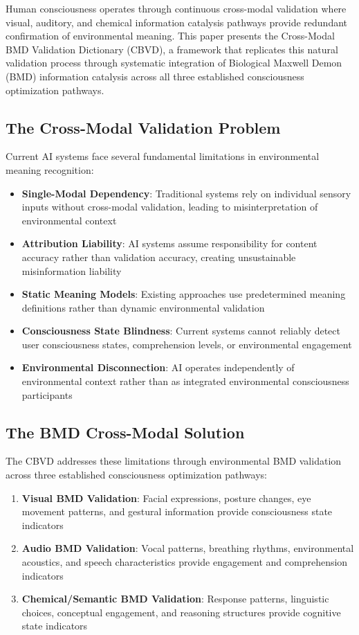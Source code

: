 \documentclass[12pt,a4paper]{article}
\begin{document}
Human consciousness operates through continuous cross-modal validation where visual, auditory, and chemical information catalysis pathways provide redundant confirmation of environmental meaning. This paper presents the Cross-Modal BMD Validation Dictionary (CBVD), a framework that replicates this natural validation process through systematic integration of Biological Maxwell Demon (BMD) information catalysis across all three established consciousness optimization pathways.

\subsection{The Cross-Modal Validation Problem}

Current AI systems face several fundamental limitations in environmental meaning recognition:

\begin{itemize}
\item \textbf{Single-Modal Dependency}: Traditional systems rely on individual sensory inputs without cross-modal validation, leading to misinterpretation of environmental context
\item \textbf{Attribution Liability}: AI systems assume responsibility for content accuracy rather than validation accuracy, creating unsustainable misinformation liability
\item \textbf{Static Meaning Models}: Existing approaches use predetermined meaning definitions rather than dynamic environmental validation
\item \textbf{Consciousness State Blindness}: Current systems cannot reliably detect user consciousness states, comprehension levels, or environmental engagement
\item \textbf{Environmental Disconnection}: AI operates independently of environmental context rather than as integrated environmental consciousness participants
\end{itemize}

\subsection{The BMD Cross-Modal Solution}

The CBVD addresses these limitations through environmental BMD validation across three established consciousness optimization pathways:

\begin{enumerate}
\item \textbf{Visual BMD Validation}: Facial expressions, posture changes, eye movement patterns, and gestural information provide consciousness state indicators
\item \textbf{Audio BMD Validation}: Vocal patterns, breathing rhythms, environmental acoustics, and speech characteristics provide engagement and comprehension indicators  
\item \textbf{Chemical/Semantic BMD Validation}: Response patterns, linguistic choices, conceptual engagement, and reasoning structures provide cognitive state indicators
\end{enumerate}
\end{document}

